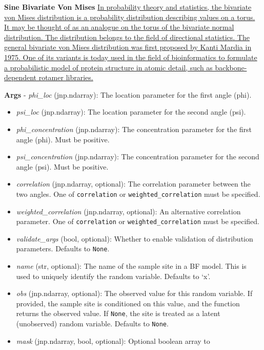 \documentclass[
  letterpaper,
  DIV=11,
  numbers=noendperiod]{scrartcl}
\begin{document}
\textbf{Sine Bivariate Von Mises}
\href{https://en.wikipedia.org/wiki/Bivariate_von_Mises_distribution}{In
probability theory and statistics, the bivariate von Mises distribution
is a probability distribution describing values on a torus. It may be
thought of as an analogue on the torus of the bivariate normal
distribution. The distribution belongs to the field of directional
statistics. The general bivariate von Mises distribution was first
proposed by Kanti Mardia in 1975. One of its variants is today used in
the field of bioinformatics to formulate a probabilistic model of
protein structure in atomic detail, such as backbone-dependent rotamer
libraries.}

\textbf{Args} - \emph{phi\_loc} (jnp.ndarray): The location parameter
for the first angle (phi).

\begin{itemize}
\item
  \emph{psi\_loc} (jnp.ndarray): The location parameter for the second
  angle (psi).
\item
  \emph{phi\_concentration} (jnp.ndarray): The concentration parameter
  for the first angle (phi). Must be positive.
\item
  \emph{psi\_concentration} (jnp.ndarray): The concentration parameter
  for the second angle (psi). Must be positive.
\item
  \emph{correlation} (jnp.ndarray, optional): The correlation parameter
  between the two angles. One of \texttt{correlation} or
  \texttt{weighted\_correlation} must be specified.
\item
  \emph{weighted\_correlation} (jnp.ndarray, optional): An alternative
  correlation parameter. One of \texttt{correlation} or
  \texttt{weighted\_correlation} must be specified.
\item
  \emph{validate\_args} (bool, optional): Whether to enable validation
  of distribution parameters. Defaults to \texttt{None}.
\item
  \emph{name} (str, optional): The name of the sample site in a BF
  model. This is used to uniquely identify the random variable. Defaults
  to `x'.
\item
  \emph{obs} (jnp.ndarray, optional): The observed value for this random
  variable. If provided, the sample site is conditioned on this value,
  and the function returns the observed value. If \texttt{None}, the
  site is treated as a latent (unobserved) random variable. Defaults to
  \texttt{None}.
\item
  \emph{mask} (jnp.ndarray, bool, optional): Optional boolean array to

\end{itemize}
\end{document}
